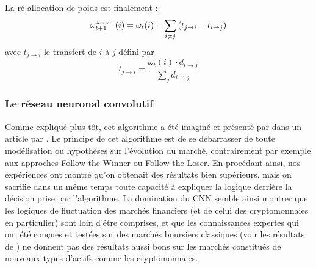 \documentclass[a4paper, 10pt]{article}
\begin{document}
La ré-allocation de poids est finalement :
\begin{equation}
    \omega_{t+1}^{\text{\tiny Anticor}}(i) = \omega_{t}(i) + \sum_{i \ne j} \left(t_{j\rightarrow i} - t_{i\rightarrow j} \right)
\end{equation}
avec $t_{j\rightarrow i}$ le transfert de $i$ à $j$ défini par
\begin{equation}
    t_{j\rightarrow i} = \frac{\omega_{t}(i) \cdot d_{i\rightarrow j}}{\sum_{j} d_{i\rightarrow j}}
\end{equation}

\subsubsection{Le réseau neuronal convolutif}
\label{sec:theorie_etude_cnn}

Comme expliqué plus tôt, cet algorithme a été imaginé et présenté par dans un article par \citet{Jiang2017}. Le principe de cet algorithme est de se débarrasser de toute modélisation ou hypothèses sur l'évolution du marché, contrairement par exemple aux approches Follow-the-Winner ou Follow-the-Loser. En procédant ainsi, nos expériences ont montré qu'on obtenait des résultats bien supérieurs, mais on sacrifie dans un même temps toute capacité à expliquer la logique derrière la décision prise par l'algorithme. La domination du CNN semble ainsi montrer que les logiques de fluctuation des marchés financiers (et de celui des cryptomonnaies en particulier) sont loin d'être comprises, et que les connaissances expertes qui ont été conçues et testées sur des marchés boursiers classiques (voir les résultats de \cite{Li2014}) ne donnent pas des résultats aussi bons sur les marchés constitués de nouveaux types d'actifs comme les cryptomonnaies.
\end{document}
